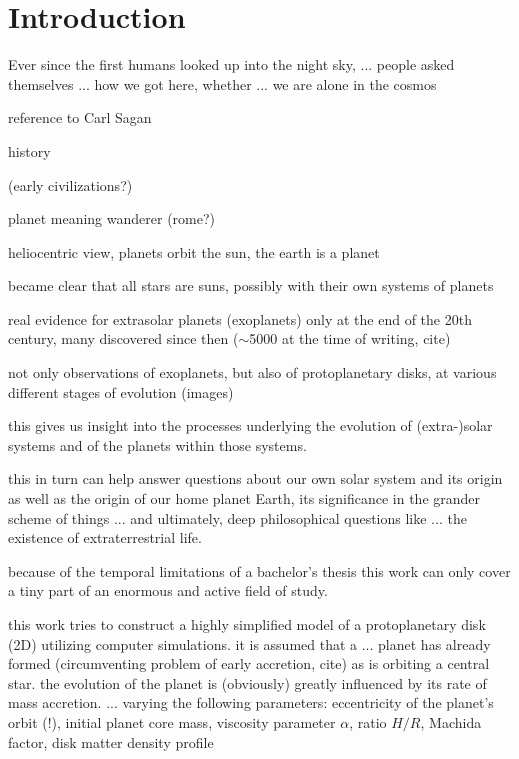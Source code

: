 
\chapter{Introduction}

Ever since the first humans looked up into the night sky, ...
people asked themselves ... 
how we got here, whether ... 
we are alone in the cosmos

reference to Carl Sagan


history

(early civilizations?)

planet meaning wanderer (rome?)

heliocentric view, planets orbit the sun, the earth is a planet

became clear that all stars are suns, possibly with their own systems of planets

real evidence for extrasolar planets (exoplanets) only at the end of the 20th 
century, many discovered since then 
($\sim$5000 at the time of writing, cite)

not only observations of exoplanets, but also of protoplanetary disks,
at various different stages of evolution (images)

this gives us insight into the
processes underlying the evolution of (extra-)solar systems and of the 
planets within those systems.

this in turn can help answer questions about our own solar system and its
origin as well as the origin of our home planet Earth, its significance in 
the grander scheme of things 
... and ultimately, deep philosophical questions like ...
the existence of extraterrestrial life.


because of the temporal limitations of a bachelor's thesis
this work can only cover a tiny part of an enormous and active field of 
study.

this work tries to construct a highly simplified model of a protoplanetary
disk (2D) utilizing computer simulations. it is assumed that a ... planet 
has already formed (circumventing problem of early accretion, cite) as is 
orbiting a central star. the evolution of the planet is (obviously) greatly 
influenced by its rate of mass accretion. 
... varying the following parameters: eccentricity of the planet's orbit (!),
initial planet core mass, viscosity parameter $\alpha$, ratio $H/R$, 
Machida factor, disk matter density profile

